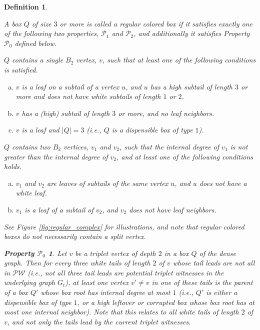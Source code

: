 \documentclass[11pt]{article}
\def\dnsitem{\vspace{-7pt}\item}
\def\dnssubitem{\vspace{-5pt}\item}
\newtheorem{definition}[theorem]{Definition}
\theoremstyle{definition}
\def\propt1{\mathcal{P}_0}
\newtheorem*{tpropt1*}{Property $\propt1$}
\def\propbr{\mathcal{P}_1}
\def\propbbr{\mathcal{P}_2}
\begin{document}
\begin{definition}
\label{def:regular_colored}

A box $Q$ of size $3$ or more is called a \emph{regular colored} box if it satisfies exactly one of the following two properties, $\propbr$ and $\propbbr$, and additionally it satisfies Property $\propt1$ defined below.

\begin{description}
	\dnsitem[$\propbr$.] $Q$ contains a single $B_2$ vertex, $v$, such that at least one of the following conditions is satisfied. 
	\begin{enumerate}[(a)]
		\dnsitem \label{invnp:1leaf}
		$v$ is a leaf on a subtail of a vertex $u$, and $u$ has a high subtail of length $3$ or more and does not have white subtails of length $1$ or $2$. 
		\dnssubitem \label{invnp:1tail}
		$v$ has a (high) subtail of length $3$ or more, and no leaf neighbors. 
		\dnssubitem \label{invnp:d1}
		$v$ is a leaf and $|Q| = 3$ (i.e., $Q$ is a dispensible box of type $1$).
	\end{enumerate}

	\dnsitem[$\propbbr$.] $Q$ contains two $B_2$ vertices, $v_1$ and $v_2$, 
	such that the internal degree of $v_1$ is not greater than the internal degree of $v_2$,
	and at least one of the following conditions holds. 
	\begin{enumerate}[(a)]
		\dnsitem \label{invnp:2leaves}
		$v_1$ and $v_2$ are leaves of subtails of the same vertex $u$, and $u$ does not have a white leaf.
		\dnssubitem \label{invnp:2tail}
		$v_1$ is a leaf of a subtail of $v_2$, and $v_2$ does not have leaf neighbors.
	\end{enumerate}
\end{description}

See Figure \ref{fig:regular_complex} for illustrations, and note that regular colored boxes do not necessarily contain a split vertex. 

\begin{tpropt1*}
Let $v$ be a triplet vertex of depth $2$ in a box $Q$ of the dense graph. 
Then for every three white tails of length $2$ of $v$ whose tail leads 
are not all in $\mathcal{PW}$ (i.e., not all three tail leads are potential triplet witnesses in the underlying graph $G_t$), 
at least one vertex $v' \neq v$ in one of these tails is the parent of a box $Q'$ whose box root has internal degree at most $1$
(i.e., $Q'$ is either a dispensible box of type $1$, or a high leftover or corrupted box whose box root has at most one internal neighbor).
Note that this relates to all white tails of length $2$ of $v$, and not only the tails lead by the current triplet witnesses.
\end{tpropt1*}
\end{definition}
\end{document}
